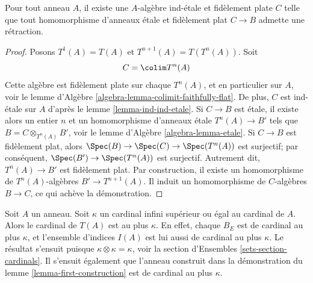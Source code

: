 \begin{lemma}
\label{lemma-first-construction}
Pour tout anneau $A$, il existe une $A$-algèbre ind-\'etale et fidèlement plate $C$
telle que tout homomorphisme d'anneaux \'etale et fidèlement plat $C \to B$ admette une rétraction.
\end{lemma}

\begin{proof}
Posons $T^1(A) = T(A)$ et $T^{n + 1}(A) = T(T^n(A))$. Soit
$$
C = \colim T^n(A)
$$
Cette algèbre est fidèlement plate sur chaque $T^n(A)$, et en particulier
sur $A$, voir le
lemme d'Algèbre \ref{algebra-lemma-colimit-faithfully-flat}.
De plus, $C$ est ind-\'etale sur $A$ d'après le lemme \ref{lemma-ind-ind-etale}.
Si $C \to B$ est \'etale, il existe alors un entier $n$ et un homomorphisme d'anneaux \'etale
$T^n(A) \to B'$ tels que $B = C \otimes_{T^n(A)} B'$, voir le
lemme d'Algèbre \ref{algebra-lemma-etale}.
Si $C \to B$ est fidèlement plat, alors $\Spec(B) \to \Spec(C) \to \Spec(T^n(A))$
est surjectif; par conséquent, $\Spec(B') \to \Spec(T^n(A))$ est surjectif.
Autrement dit, $T^n(A) \to B'$ est fidèlement plat.
Par construction, il existe un homomorphisme de $T^n(A)$-algèbres
$B' \to T^{n + 1}(A)$. Il induit un homomorphisme de $C$-algèbres $B \to C$,
ce qui achève la démonstration.
\end{proof}

\begin{remark}
\label{remark-size-T}
Soit $A$ un anneau. Soit $\kappa$ un cardinal infini supérieur ou
égal au cardinal de $A$. Alors le cardinal de $T(A)$
est au plus $\kappa$. En effet, chaque $B_E$ est de cardinal au plus
$\kappa$, et l'ensemble d'indices $I(A)$ est lui aussi de cardinal au plus $\kappa$.
Le résultat s'ensuit puisque $\kappa \otimes \kappa = \kappa$, voir la
section d'Ensembles \ref{sets-section-cardinals}. Il s'ensuit également que
l'anneau construit dans la démonstration du lemme \ref{lemma-first-construction}
est de cardinal au plus $\kappa$.
\end{remark}


